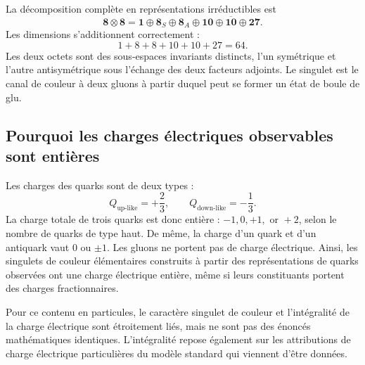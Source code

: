 La décomposition complète en représentations irréductibles est
\begin{equation}
\boldsymbol 8\otimes\boldsymbol 8
=\boldsymbol 1\oplus\boldsymbol 8_S\oplus\boldsymbol 8_A
\oplus\boldsymbol{10}\oplus\overline{\boldsymbol{10}}
\oplus\boldsymbol{27}.
\label{eq:l4-eight-times-eight}
\end{equation}
Les dimensions s’additionnent correctement :
\begin{equation}
1+8+8+10+10+27=64.
\end{equation}
Les deux octets sont des sous-espaces invariants distincts, l’un symétrique et l’autre antisymétrique sous l’échange des deux facteurs adjoints. Le singulet est le canal de couleur à deux gluons à partir duquel peut se former un état de boule de glu.

\subsection{Pourquoi les charges électriques observables sont entières}

Les charges des quarks sont de deux types :
\begin{equation}
Q_{\mathrm{up\text{-}like}}=+\frac23,
\qquad
Q_{\mathrm{down\text{-}like}}=-\frac13.
\end{equation}
La charge totale de trois quarks est donc entière : \(-1,0,+1,\text{ or }+2\), selon le nombre de quarks de type haut. De même, la charge d’un quark et d’un antiquark vaut \(0\) ou \(\pm1\). Les gluons ne portent pas de charge électrique. Ainsi, les singulets de couleur élémentaires construits à partir des représentations de quarks observées ont une charge électrique entière, même si leurs constituants portent des charges fractionnaires.

\begin{classroomqa}
\end{classroomqa}

Pour ce contenu en particules, le caractère singulet de couleur et l’intégralité de la charge électrique sont étroitement liés, mais ne sont pas des énoncés mathématiques identiques. L’intégralité repose également sur les attributions de charge électrique particulières du modèle standard qui viennent d’être données.

